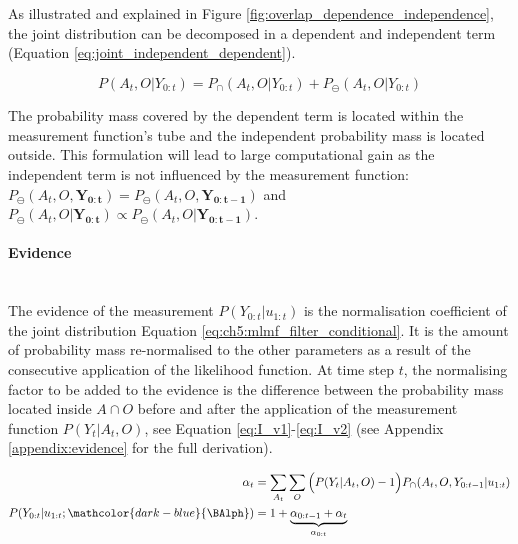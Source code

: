 As illustrated and explained in Figure \ref{fig:overlap_dependence_independence}, the joint distribution can be decomposed in a 
dependent and independent term (Equation \ref{eq:joint_independent_dependent}). 

\begin{equation}\label{eq:joint_independent_dependent}
 P(A_t,O|Y_{0:t}) = P_{\cap}(A_t,O|Y_{0:t}) + P_{\ominus}(A_t,O|Y_{0:t})
\end{equation}

The probability mass covered by the dependent term is located within the measurement function's tube and the independent probability mass 
is located outside. This formulation will lead to large computational gain 
as the independent term is not influenced by the measurement function: 
$P_{\ominus}(A_t,O,\mathbf{Y_{0:t}}) = P_{\ominus}(A_t,O,\mathbf{Y_{0:t-1}})$ and 
$P_{\ominus}(A_t,O|\mathbf{Y_{0:t}}) \propto P_{\ominus}(A_t,O|\mathbf{Y_{0:t-1}})$.

\paragraph{Evidence}\\
The evidence of the measurement $P(Y_{0:t}|u_{1:t})$ is the normalisation coefficient of the joint distribution Equation \ref{eq:ch5:mlmf_filter_conditional}.
It is the amount of probability mass re-normalised to the other parameters as a result of the consecutive application of the likelihood function.
At time step $t$, the normalising factor to be added to the evidence is the difference between the probability mass located 
inside $A\cap O$ before and after the application of the measurement function $P(Y_t|A_t,O)$, 
see Equation \ref{eq:I_v1}-\ref{eq:I_v2} (see Appendix \ref{appendix:evidence} for the full derivation).

\begin{align}
 \alpha_t 			 	&= \sum\limits_{A_t}\sum\limits_{O} \Big(P(Y_t|A_t,O) - 1\Big)P_{\cap}(A_t,O,Y_{0:t-1}|u_{1:t}) \label{eq:I_v1} \\
 P(Y_{0:t}|u_{1:t};\mathcolor{dark-blue}{\BAlph})        &= 1 + \underbrace{\alpha_{0:t-1} + \alpha_t}_{\alpha_{0:t}} \label{eq:I_v2}
\end{align}

